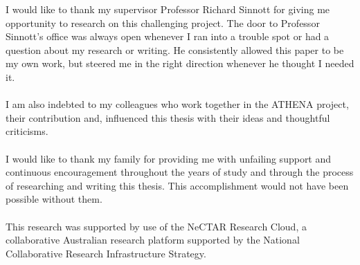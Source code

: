 \documentclass[
11pt, %
oneside, %
english, %
singlespacing, %
headsepline, %
chapterinoneline, %
consistentlayout, %
]{MastersDoctoralThesis} %
\begin{document}
\begin{acknowledgements}
\addchaptertocentry{\acknowledgementname} %
\bigskip\noindent\ignorespaces

I would like to thank my supervisor Professor Richard Sinnott for giving me opportunity to research on this challenging project. The door to Professor Sinnott's office was always open whenever I ran into a trouble spot or had a question about my research or writing. He consistently allowed this paper to be my own work, but steered me in the right direction whenever he thought I needed it.
\\
\\
I am also indebted to my colleagues who work together in the ATHENA project, their contribution and, influenced this thesis with their ideas and thoughtful criticisms.
\\
\\
I would like to thank my family for providing me with unfailing support and continuous encouragement throughout the years of study and through the process of researching and writing this thesis. This accomplishment would not have been possible without them.
\\
\\
This research was supported by use of the NeCTAR Research Cloud, a collaborative Australian research platform supported by the National Collaborative Research Infrastructure Strategy.


\end{acknowledgements}


\tableofcontents %





\end{document}
